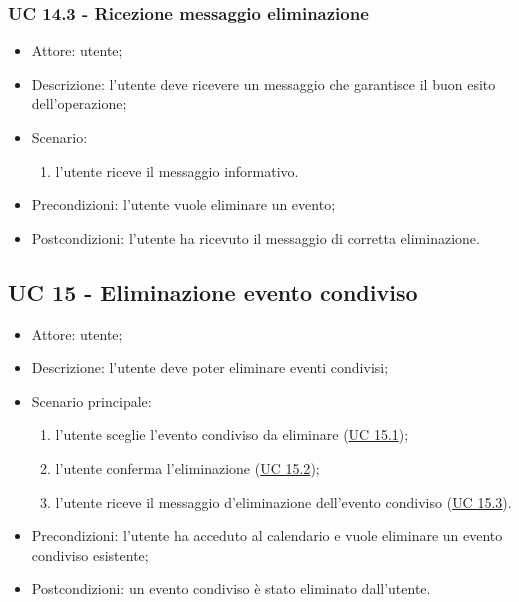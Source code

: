 \subsubsection{UC 14.3 - Ricezione messaggio eliminazione} \label{sec: UC 14.3}
\begin{itemize}
    \item Attore: utente;
    \item Descrizione: l'utente deve ricevere un messaggio che garantisce il buon esito dell'operazione;
    \item Scenario:
        \begin{enumerate}
        \item l'utente riceve il messaggio informativo.
        \end{enumerate}
    
    \item Precondizioni: l'utente vuole eliminare un evento;
    \item Postcondizioni: l'utente ha ricevuto il messaggio di corretta eliminazione.
\end{itemize}


\subsection{UC 15 - Eliminazione evento condiviso}
\begin{itemize}
    \item Attore: utente;
    \item Descrizione: l'utente deve poter eliminare eventi condivisi;
    \item Scenario principale:
        \begin{enumerate}
        \item l'utente sceglie l'evento condiviso da eliminare (\hyperref[sec: UC 15.1]{UC 15.1});
        \item l'utente conferma l'eliminazione (\hyperref[sec: UC 15.2]{UC 15.2});
        \item l'utente riceve il messaggio d'eliminazione dell'evento condiviso (\hyperref[sec: UC 15.3]{UC 15.3}).
        \end{enumerate}
    \item Precondizioni: l'utente ha acceduto al calendario e vuole eliminare un evento condiviso esistente;
    \item Postcondizioni: un evento condiviso è stato eliminato dall'utente.
\end{itemize}

